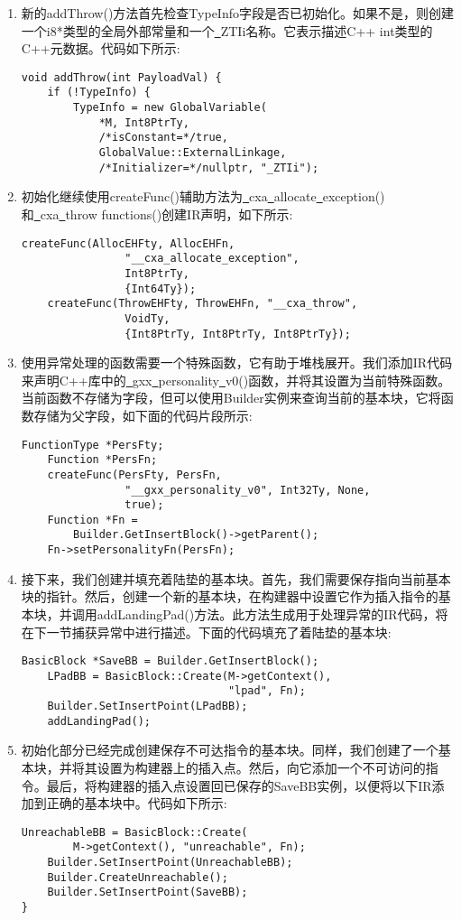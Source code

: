 \begin{enumerate}
\item 新的addThrow()方法首先检查TypeInfo字段是否已初始化。如果不是，则创建一个i8*类型的全局外部常量和一个\underline{~}ZTIi名称。它表示描述C++ int类型的C++元数据。代码如下所示:
\begin{lstlisting}[caption={}]
void addThrow(int PayloadVal) {
	if (!TypeInfo) {
		TypeInfo = new GlobalVariable(
			*M, Int8PtrTy,
			/*isConstant=*/true,
			GlobalValue::ExternalLinkage,
			/*Initializer=*/nullptr, "_ZTIi");
\end{lstlisting}

\item 初始化继续使用createFunc()辅助方法为\underline{~}cxa\underline{~}allocate\underline{~}exception()和\underline{~}cxa\underline{~}throw functions()创建IR声明，如下所示:
\begin{lstlisting}[caption={}]
	createFunc(AllocEHFty, AllocEHFn,
				"__cxa_allocate_exception", 
				Int8PtrTy,
				{Int64Ty});
	createFunc(ThrowEHFty, ThrowEHFn, "__cxa_throw",
				VoidTy,
				{Int8PtrTy, Int8PtrTy, Int8PtrTy});
\end{lstlisting}

\item 使用异常处理的函数需要一个特殊函数，它有助于堆栈展开。我们添加IR代码来声明C++库中的\underline{~}gxx\underline{~}personality\underline{~}v0()函数，并将其设置为当前特殊函数。当前函数不存储为字段，但可以使用Builder实例来查询当前的基本块，它将函数存储为父字段，如下面的代码片段所示:
\begin{lstlisting}[caption={}]
	FunctionType *PersFty;
	Function *PersFn;
	createFunc(PersFty, PersFn,
				"__gxx_personality_v0", Int32Ty, None,
				true);
	Function *Fn =
		Builder.GetInsertBlock()->getParent();
	Fn->setPersonalityFn(PersFn);
\end{lstlisting}

\item 接下来，我们创建并填充着陆垫的基本块。首先，我们需要保存指向当前基本块的指针。然后，创建一个新的基本块，在构建器中设置它作为插入指令的基本块，并调用addLandingPad()方法。此方法生成用于处理异常的IR代码，将在下一节捕获异常中进行描述。下面的代码填充了着陆垫的基本块:
\begin{lstlisting}[caption={}]
	BasicBlock *SaveBB = Builder.GetInsertBlock();
	LPadBB = BasicBlock::Create(M->getContext(),
								"lpad", Fn);
	Builder.SetInsertPoint(LPadBB);
	addLandingPad();
\end{lstlisting}

\item 初始化部分已经完成创建保存不可达指令的基本块。同样，我们创建了一个基本块，并将其设置为构建器上的插入点。然后，向它添加一个不可访问的指令。最后，将构建器的插入点设置回已保存的SaveBB实例，以便将以下IR添加到正确的基本块中。代码如下所示:
\begin{lstlisting}[caption={}]
	UnreachableBB = BasicBlock::Create(
		M->getContext(), "unreachable", Fn);
	Builder.SetInsertPoint(UnreachableBB);
	Builder.CreateUnreachable();
	Builder.SetInsertPoint(SaveBB);
}
\end{lstlisting}


\end{enumerate}
